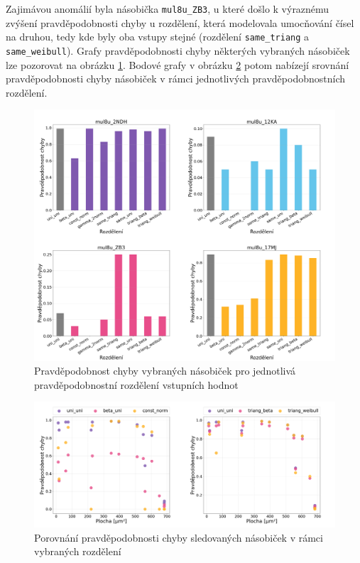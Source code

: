 Zajimávou anomálií byla násobička \texttt{mul8u\_ZB3}, u které došlo k výraznému zvýšení pravděpodobnosti chyby u rozdělení, která modelovala umocňování čísel na druhou, tedy kde byly oba vstupy stejné (rozdělení \texttt{same\_triang} a \texttt{same\_weibull}). Grafy pravděpodobnosti chyby některých vybraných násobiček lze pozorovat na obrázku \ref{fig:metrics_error_prob}. Bodové grafy v obrázku \ref{fig:scatter_error_prob} potom nabízejí srovnání pravděpodobnosti chyby násobiček v rámci jednotlivých pravděpodobnostních rozdělení.

\begin{figure}[H]
    \centering
    \includegraphics[width=\textwidth]{obrazky-figures/metrics_error_prob.png}
    \caption{Pravděpodobnost chyby vybraných násobiček pro jednotlivá pravděpodobnostní rozdělení vstupních hodnot}
    \label{fig:metrics_error_prob}
\end{figure}

\begin{figure}[H]
    \centering
    \includegraphics[width=\textwidth]{obrazky-figures/scatter_error_prob.png}
    \caption{Porovnání pravděpodobnosti chyby sledovaných násobiček v rámci vybraných rozdělení}
    \label{fig:scatter_error_prob}
\end{figure}

